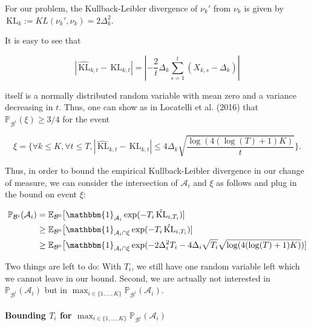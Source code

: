 \documentclass[12pt,]{article}
\let\oldparagraph\paragraph
\renewcommand{\paragraph}[1]{\oldparagraph{#1}\mbox{}}
\newcommand{\KL}{\,\text{KL}}
\begin{document}
For our problem, the Kullback-Leibler divergence of \(\nu_k'\) from
\(\nu_k\) is given by \(\KL_k := KL(\nu_k', \nu_k) = 2\Delta_k^2\).

It is easy to see that

\begin{equation*}
|\hat{\KL}_{k,t} - \KL_{k,t}| = |-\frac{2}{t} \Delta_k \sum_{s=1}^{t}(X_{k,s} - \Delta_k)|
\end{equation*}

itself is a normally distributed random variable with mean zero and a
variance decreasing in \(t\). Thus, one can show as in Locatelli et al.
(2016) that \(\mathbb{P}_{\mathcal{B}^i}(\xi) \geq 3/4\) for the event

\begin{equation}
\xi = \{ \forall k \leq K, \forall t \leq T, |\hat{\KL}_{k,t} - \KL_{k,t}| \leq 4 \Delta_k \sqrt{\frac{\log(4(\log(T)+1)K)}{t}}\}. \label{LocatelliTheorem1EventXi}
\end{equation}

Thus, in order to bound the empirical Kullback-Leibler divergence in our
change of measure, we can consider the intersection of \(\mathcal{A}_i\)
and \(\xi\) as follows and plug in the bound on event \(\xi\):

\begin{align*}
\mathbb{P}_{\mathcal{B}^i}(\mathcal{A}_i) & = \mathbb{E}_{\mathcal{B}^0} \big[\mathbbm{1}_{\mathcal{A}_i} \exp (- T_i \hat{\KL}_{i,T_i}) ] \\
& \geq \mathbb{E}_{\mathcal{B}^0} \big[\mathbbm{1}_{\mathcal{A}_i \cap \xi} \exp (- T_i \hat{\KL}_{i,T_i}) ] \\
& \geq \mathbb{E}_{\mathcal{B}^0} \big[\mathbbm{1}_{\mathcal{A}_i \cap \xi} \exp (- 2 \Delta_i^2 T_i - 4 \Delta_i \sqrt{T_i} \sqrt{\log(4(\log(T)+1)K)}) ]
\end{align*}

Two things are left to do: With \(T_i\), we still have one random
variable left which we cannot leave in our bound. Second, we are
actually not interested in \(\mathbb{P}_{\mathcal{B}^i}(\mathcal{A}_i)\)
but in
\(\max_{i \in \{1,\dots,K\}} \mathbb{P}_{\mathcal{B}^i}(\mathcal{A}_i)\).

\paragraph{\texorpdfstring{Bounding \(T_i\) for
\(\max_{i \in \{1,\dots,K\}}\mathbb{P}_{\mathcal{B}^i}(\mathcal{A}_i)\)}{Bounding T\_i for \textbackslash{}max\_\{i \textbackslash{}in \textbackslash{}\{1,\textbackslash{}dots,K\textbackslash{}\}\}\textbackslash{}mathbb\{P\}\_\{\textbackslash{}mathcal\{B\}\^{}i\}(\textbackslash{}mathcal\{A\}\_i)}}\label{bounding-t_i-for-max_i-in-1dotskmathbbp_mathcalbimathcala_i}
\end{document}
